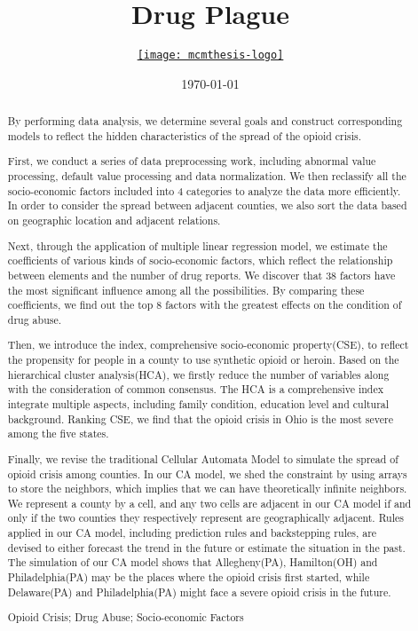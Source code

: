 \documentclass{mcmthesis}
\title{Drug Plague}
\author{\small \href{http://www.latexstudio.net/}
  {\texttt{[image: mcmthesis-logo]}}}
\date{\today}
\begin{document}
\begin{abstract}


By performing data analysis, we determine several goals and construct corresponding models to reflect the hidden characteristics of the spread of the opioid crisis.\par

First, we conduct a series of data preprocessing work, including abnormal value processing, default value processing and data normalization. We then reclassify all the socio-economic factors included into 4 categories to analyze the data more efficiently. In order to consider the spread between adjacent counties, we also sort the data based on geographic location and adjacent relations.\par

Next, through the application of multiple linear regression model, we estimate the coefficients of various kinds of socio-economic factors, which reflect the relationship between elements and the number of drug reports. We discover that 38 factors have the most significant influence among all the possibilities. By comparing these coefficients, we find out the top 8 factors with the greatest effects on the condition of drug abuse.\par

Then, we introduce the index, comprehensive socio-economic property(CSE), to reflect the propensity for people in a county to use synthetic opioid or heroin. Based on the hierarchical cluster analysis(HCA), we firstly reduce the number of variables along with the consideration of common consensus. The HCA is a comprehensive index integrate multiple aspects, including family condition, education level and cultural background. Ranking CSE, we find that  the opioid crisis in Ohio is the most severe among the five states.\par

Finally, we revise the traditional Cellular Automata Model to simulate the spread of opioid crisis among counties. In our CA model, we shed the constraint by using arrays to store the neighbors, which implies that we can have theoretically infinite neighbors. We represent a county by a cell, and any two cells are adjacent in our CA model if and only if the two counties they respectively represent are geographically adjacent. Rules applied in our CA model, including prediction rules and backstepping rules, are devised to either forecast the trend in the future or estimate the situation in the past. The simulation of our CA model shows that Allegheny(PA), Hamilton(OH) and Philadelphia(PA) may be the places where the opioid crisis first started, while Delaware(PA) and Philadelphia(PA) might face a severe opioid crisis in the future. 
\begin{keywords}
Opioid Crisis; Drug Abuse; Socio-economic Factors 
\end{keywords}
\end{abstract}
\maketitle
\end{document}
